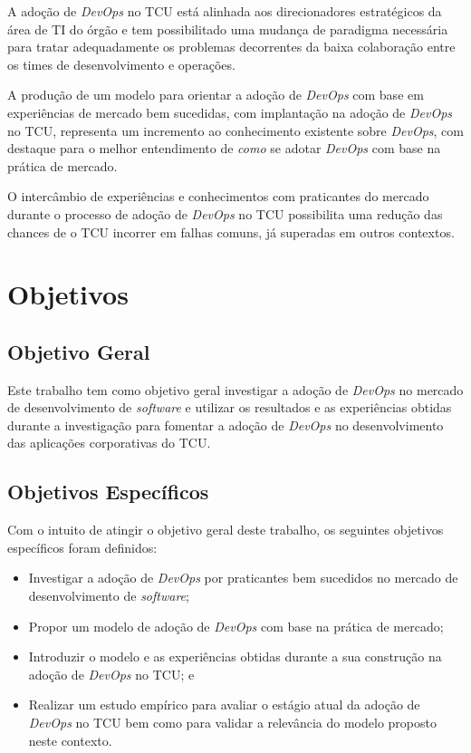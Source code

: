 A adoção de \textit{DevOps} no \acrshort{TCU} está alinhada aos direcionadores
estratégicos da área de \acrshort{TI} do órgão e tem possibilitado uma
mudança de paradigma necessária para tratar adequadamente os problemas
decorrentes da baixa colaboração entre os times de desenvolvimento e operações.

A produção de um modelo para orientar a adoção de \textit{DevOps} com base em
experiências de mercado bem sucedidas, com implantação na adoção de
\textit{DevOps} no \acrshort{TCU}, representa um
incremento ao conhecimento existente sobre \textit{DevOps}, com destaque
para o melhor entendimento de \emph{como} se adotar \textit{DevOps} com base na
prática de mercado.

O intercâmbio de experiências e conhecimentos com praticantes do mercado
durante o processo de adoção de \textit{DevOps} no TCU possibilita uma redução
das chances de o \acrshort{TCU} incorrer em falhas comuns, já superadas em
outros contextos.

\section{Objetivos}

\subsection{Objetivo Geral}

Este trabalho tem como objetivo geral investigar a adoção de {\it DevOps} no
mercado de desenvolvimento de {\it software} e utilizar os resultados e as
experiências obtidas durante a investigação para fomentar a adoção de \textit{DevOps}
no desenvolvimento das aplicações corporativas do \acrshort{TCU}.

\subsection{Objetivos Específicos}
Com o intuito de atingir o objetivo geral deste trabalho, os seguintes objetivos
específicos foram definidos:

\begin{itemize}
\item Investigar a adoção de \textit{DevOps} por praticantes bem sucedidos no
mercado de desenvolvimento de \textit{software};
\item Propor um modelo de adoção de \textit{DevOps} com base na prática de mercado;
\item Introduzir o modelo e as experiências obtidas durante a sua construção na
adoção de \textit{DevOps} no \acrshort{TCU}; e
\item Realizar um estudo empírico para avaliar o estágio atual da adoção de
\textit{DevOps} no \acrshort{TCU} bem como para validar a relevância do modelo
proposto neste contexto.
\end{itemize}

